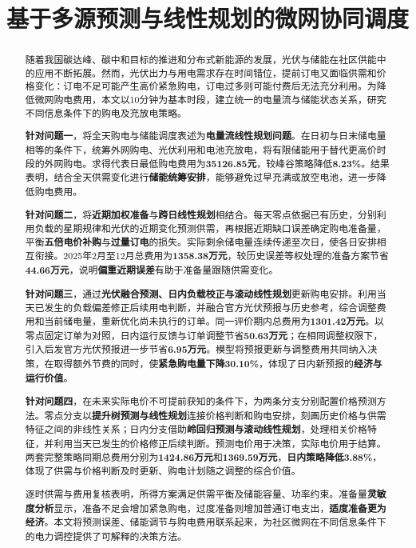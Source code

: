 \title{基于多源预测与线性规划的微网协同调度}
\date{}
\maketitle
\begingroup
{}
\begin{abstract}
\noindent\hspace*{2em}随着我国碳达峰、碳中和目标的推进和分布式新能源的发展，光伏与储能在社区供能中的应用不断拓展。然而，光伏出力与用电需求存在时间错位，提前订电又面临供需和价格变化：订电不足可能产生高价紧急购电，订电过多则可能付费后无法充分利用。为降低微网购电费用，本文以10分钟为基本时段，建立统一的电量流与储能状态关系，研究不同信息条件下的购电及充放电策略。

\textbf{针对问题一}，将全天购电与储能调度表述为\textbf{电量流线性规划问题}。在日初与日末储电量相等的条件下，统筹外网购电、光伏利用和电池充放电，将有限储能用于替代更高价时段的外网购电。求得代表日最低购电费用为\textbf{35126.85元}，较峰谷策略降低\textbf{8.23\%}。结果表明，结合全天供需变化进行\textbf{储能统筹安排}，能够避免过早充满或放空电池，进一步降低购电费用。

\textbf{针对问题二}，将\textbf{近期加权准备}与\textbf{跨日线性规划}相结合。每天零点依据已有历史，分别利用负载的星期规律和光伏的近期变化预测供需，再根据近期缺口误差确定购电准备量，平衡\textbf{五倍电价补购}与\textbf{过量订电}的损失。实际剩余储电量连续传递至次日，使各日安排相互衔接。2025年2月至12月总费用为\textbf{1358.38万元}，较历史误差等权处理的准备方案节省\textbf{44.66万元}，说明\textbf{偏重近期误差}有助于准备量跟随供需变化。

\textbf{针对问题三}，通过\textbf{光伏融合预测、日内负载校正与滚动线性规划}更新购电安排。利用当天已发生的负载偏差修正后续用电判断，并融合官方光伏预报与历史参考，综合调整费用和当前储电量，重新优化尚未执行的订单。同一评价期内总费用为\textbf{1301.42万元}。以零点固定订单为对照，日内运行反馈与订单调整节省\textbf{50.63万元}；在相同调整权限下，引入后发官方光伏预报进一步节省\textbf{6.95万元}。模型将预报更新与调整费用共同纳入决策，在取得额外节费的同时，使\textbf{紧急购电量下降30.10\%}，体现了日内新预报的\textbf{经济与运行价值}。

\textbf{针对问题四}，在未来实际电价不可提前获知的条件下，为两条分支分别配置价格预测方法。零点分支以\textbf{提升树预测与线性规划}连接价格判断和购电安排，刻画历史价格与供需特征之间的非线性关系；日内分支借助\textbf{岭回归预测与滚动线性规划}，处理相关价格特征，并利用当天已发生的价格修正后续判断。预测电价用于决策，实际电价用于结算。两套完整策略同期总费用分别为\textbf{1424.86万元}和\textbf{1369.59万元}，\textbf{日内策略降低3.88\%}，体现了供需与价格判断及时更新、购电计划随之调整的综合价值。

逐时供需与费用复核表明，所得方案满足供需平衡及储能容量、功率约束。准备量\textbf{灵敏度分析}显示，准备不足会增加紧急购电，过度准备则增加普通订电支出，\textbf{适度准备更为经济}。本文将预测误差、储能调节与购电费用联系起来，为社区微网在不同信息条件下的电力调控提供了可解释的决策方法。
\end{abstract}
\par
\endgroup

